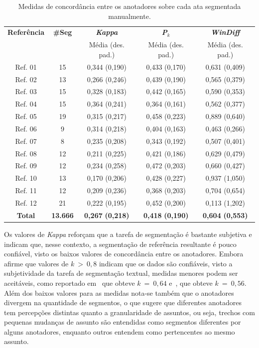 \begin{table}[!h]
	\centering
 \begin{tabular}{|c|c|c|c|c|}

\hline
\textbf{Referência}  & \textbf{\#Seg} & \textbf{\textit{Kappa}}  & \textbf{\textit{P}$_k$}                &  \textbf{\textit{WinDiff}}\\ 
	& & Média (des. pad.) & Média (des. pad.)&Média (des. pad.) \\ \hline
Ref. 01     & 15    & 0,344  (0,190) & 0,433  (0,170) & 0,631  (0,409) \\ \hline
Ref. 02     & 13    & 0,266  (0,246) & 0,439  (0,190) & 0,565  (0,379) \\ \hline
Ref. 03     & 15    & 0,328  (0,183) & 0,442  (0,165) & 0,590  (0,353) \\ \hline
Ref. 04     & 15    & 0,364  (0,241) & 0,364  (0,161) & 0,562  (0,377) \\ \hline
Ref. 05     & 19    & 0,315  (0,217) & 0,458  (0,223) & 0,889  (0,640) \\ \hline
Ref. 06     & 9     & 0,314  (0,218) & 0,404  (0,163) & 0,463  (0,266) \\ \hline
Ref. 07     & 8     & 0,235  (0,208) & 0,343  (0,192) & 0,507  (0,401) \\ \hline
Ref. 08     & 12    & 0,211  (0,225) & 0,421  (0,186) & 0,629  (0,479) \\ \hline
Ref. 09     & 12    & 0,234  (0,258) & 0,472  (0,203) & 0,660  (0,427) \\ \hline
Ref. 10     & 13    & 0,170  (0,206) & 0,428  (0,227) & 0,937  (1,050) \\ \hline
Ref. 11     & 12    & 0,209  (0,236) & 0,368  (0,203) & 0,704  (0,654) \\ \hline
Ref. 12     & 21    & 0,222  (0,195) & 0,452  (0,200) & 0,113  (1,202) \\ \hline
\textbf{Total}      & \textbf{13.666} & \textbf{0,267}  \textbf{(0,218)} & \textbf{0,418}  \textbf{(0,190)} & \textbf{0,604}  \textbf{(0,553)} \\ \hline
\end{tabular}
\caption{Medidas de concordância entre os anotadores sobre cada ata segmentada manualmente.}
\label{tab:detalhesSegRef}
\end{table}




Os valores de \textit{Kappa} reforçam que a tarefa de segmentação é bastante subjetiva e indicam que, nesse contexto, a segmentação de referência resultante é pouco confiável, visto os baixos valores de concordância entre os anotadores. 
Embora~\cite{Carletta1996} afirme que valores de $k~>~0,8$ indicam que os dados são confiáveis, visto a subjetividade da tarefa de segmentação textual, medidas menores podem ser aceitáveis, como reportado em~\cite{Hearst1997} que obteve $k~=~0,64$ e~\cite{Cardoso2017}, que obteve $k~=~0,56$. Além dos baixos valores para as medidas nota-se também que o anotadores divergem na quantidade de segmentos, o que sugere que diferentes anotadores tem percepções distintas quanto a granularidade de assuntos, ou seja, trechos com pequenas mudanças de assunto são entendidas como segmentos diferentes por alguns anotadores, enquanto outros entendem como pertencentes ao mesmo assunto.

